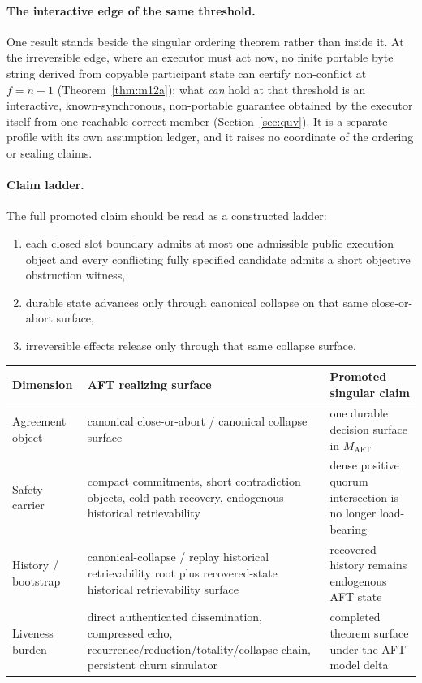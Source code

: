 \documentclass[11pt]{article}
\begin{document}
\paragraph{The interactive edge of the same threshold.}
One result stands beside the singular ordering theorem rather than inside
it. At the irreversible edge, where an executor must act now, no finite
portable byte string derived from copyable participant state can certify
non-conflict at \(f = n-1\) (Theorem~\ref{thm:m12a}); what \emph{can} hold
at that threshold is an interactive, known-synchronous, non-portable
guarantee obtained by the executor itself from one reachable correct member
(Section~\ref{sec:quv}). It is a separate profile with its own assumption
ledger, and it raises no coordinate of the ordering or sealing claims.

\paragraph{Claim ladder.}
The full promoted claim should be read as a constructed ladder:
\begin{enumerate}[leftmargin=1.5em]
\item each closed slot boundary admits at most one admissible public execution
object and every conflicting fully specified candidate admits a short
objective obstruction witness,
\item durable state advances only through canonical collapse on that same
close-or-abort surface,
\item irreversible effects release only through that same collapse surface.
\end{enumerate}

\begin{center}
\small
\begin{tabularx}{\textwidth}{>{\raggedright\arraybackslash}p{} >{\raggedright\arraybackslash}p{} X}
\toprule
\textbf{Dimension} & \textbf{AFT realizing surface} & \textbf{Promoted singular claim} \\
\midrule
Agreement object & canonical close-or-abort / canonical collapse surface & one durable decision surface in \(M_{\mathrm{AFT}}\) \\
Safety carrier & compact commitments, short contradiction objects, cold-path recovery, endogenous historical retrievability & dense positive quorum intersection is no longer load-bearing \\
History / bootstrap & canonical-collapse / replay historical retrievability root plus recovered-state historical retrievability surface & recovered history remains endogenous AFT state \\
Liveness burden & direct authenticated dissemination, compressed echo, recurrence/reduction/totality/collapse chain, persistent churn simulator & completed theorem surface under the AFT model delta \\
\bottomrule
\end{tabularx}
\end{center}
\end{document}
